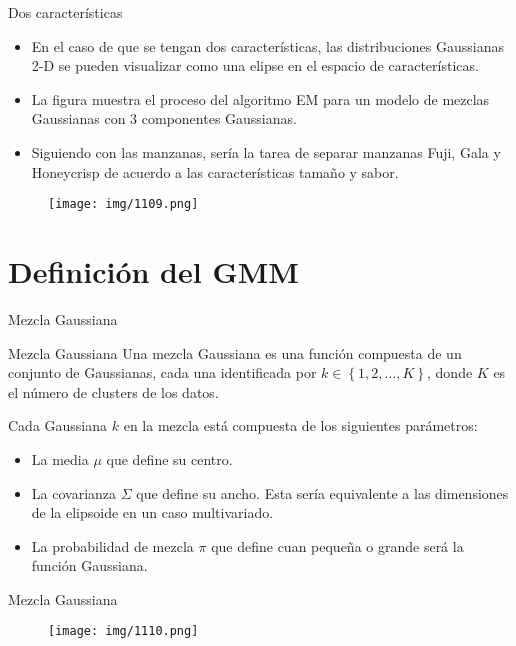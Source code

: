 \documentclass[11pt,aspectratio=169]{beamer}
\begin{document}
\begin{frame}{Dos características}
\begin{itemize}
	\item En el caso de que se tengan dos características, las distribuciones Gaussianas 2-D se pueden visualizar como una elipse en el 
		espacio de características.\pause
	\item La figura muestra el proceso del algoritmo EM para un modelo de mezclas Gaussianas con 3 componentes Gaussianas.\pause
	\item Siguiendo con las manzanas, sería la tarea de separar manzanas Fuji, Gala y Honeycrisp de acuerdo a las características tamaño 
		y sabor.
\end{itemize}
\begin{figure}[H]
	\centering
	\texttt{[image: img/1109.png]}
\end{figure}
\end{frame}

\section{Definición del GMM}
\begin{frame}{Mezcla Gaussiana}
\begin{block}{Mezcla Gaussiana}
Una mezcla Gaussiana es una función compuesta de un conjunto de Gaussianas, cada una identificada por $k\in\left\lbrace 1,2,\dots,K\right\rbrace$,
donde $K$ es el número de clusters de los datos.
\end{block}\pause
Cada Gaussiana $k$ en la mezcla está compuesta de los siguientes parámetros:\pause
\begin{itemize}
	\item La media $\mu$ que define su centro.\pause
	\item La covarianza $\Sigma$ que define su ancho. Esta sería equivalente a las dimensiones de la elipsoide en un caso multivariado.\pause
	\item La probabilidad de mezcla $\pi$ que define cuan pequeña o grande será la función Gaussiana.
\end{itemize}
\end{frame}

\begin{frame}{Mezcla Gaussiana}
\begin{figure}[H]
	\centering
	\texttt{[image: img/1110.png]}
\end{figure}
\end{frame}
\end{document}
